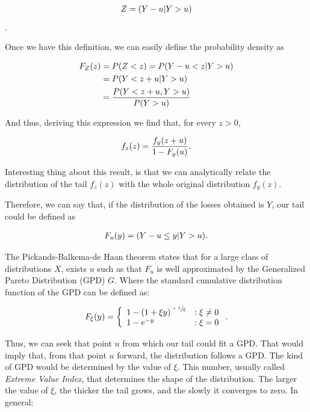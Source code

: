 \begin{align}
    Z = \qty(Y-u | Y>u)
\end{align}.

Once we have this definition, we can easily define the probability density as

\begin{align}
    F_Z(z)  &=  P(Z < z) = P\qty(Y-u < z | Y>u)  \\
            &=  P\qty(Y<z+u | Y>u) \\
            &= \frac{P\qty(Y<z+u, Y>u)}{P\qty(Y>u)}
\end{align}

And thus, deriving this expression we find that, for every $z>0$,

\begin{align}
    f_z(z) = \frac{f_y\qty(z+u)}{1-F_y(u)}\textit{.}
\end{align}

Interesting thing about this result, is that we can analytically relate the distribution of the tail $f_z(z)$ with the whole original distribution $f_y(z)$.

Therefore, we can say that, if the distribution of the losses obtained is $Y$, our tail could be defined as

\begin{align}
    F_u(y) = \qty( Y - u \leq y| Y > u ) \emph{.}
\end{align}

The Pickands-Balkema-de Haan theorem states that for a large class of distributions $X$, exists $u$ such as that $F_u$ is well approximated by the Generalized Pareto Distribution (GPD) $G$. Where the standard cumulative distribution function of the GPD can be defined as:


\[F_{\xi}(y) = \left\{
  \begin{array}{lr}
    1 - \qty(1 + \xi y)^{\sfrac{-1}{\xi}} & : \xi \neq 0\\
    1 - e^{-y} & : \xi = 0
  \end{array}
\right. \emph{.}
\]

Thus, we can seek that point $u$ from which our tail could fit a GPD. That would imply that, from that point $u$ forward, the distribution follows a GPD. The kind of GPD would be determined by the value of $\xi$. This number, usually called \emph{Extreme Value Index}, that determines  the shape of the distribution. The larger the value of $\xi$, the thicker the tail grows, and the slowly it converges to zero. In general:

